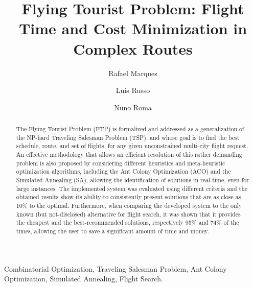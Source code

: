 \documentclass[onecolumn]{elsarticle}
\begin{document}
\begin{frontmatter}


\title{Flying Tourist Problem: Flight Time and Cost Minimization in Complex Routes}




\author[inescid,ist]{Rafael Marques}
\author[inescid,ist]{Lu\' is Russo}
\author[inescid,ist]{Nuno Roma}

\address[ist]{Instituto Superior T\'ecnico, Universidade de Lisboa}
\address[inescid]{INESC-ID, Rua Alves Redol, 9, 1000-029 Lisboa, Portugal}

\begin{abstract}
The Flying Tourist Problem (FTP) is formalized and addressed as a generalization of the NP-hard Traveling Salesman Problem (TSP), and whose goal is to find the best schedule, route, and set of flights, for any given unconstrained multi-city flight request. An effective methodology that allows an efficient resolution of this rather demanding problem is also proposed by considering different heuristics and meta-heuristic optimization algorithms, including the Ant Colony Optimization (ACO) and the Simulated Annealing (SA), allowing the identification of solutions in real-time, even for large instances. The implemented system was evaluated using different criteria and the obtained results show its ability to consistently present solutions that are as close as 10\% to the optimal. Furthermore, when comparing the developed system to the only known (but not-disclosed) alternative for flight search, it was shown that it provides the cheapest and the best-recommended solutions, respectively 95\% and 74\% of the times, allowing the user to save a significant amount of time and money.
\end{abstract}

\begin{keyword}
Combinatorial Optimization, Traveling Salesman Problem, Ant Colony Optimization, Simulated Annealing, Flight Search.
\end{keyword}

\end{frontmatter}
\end{document}
